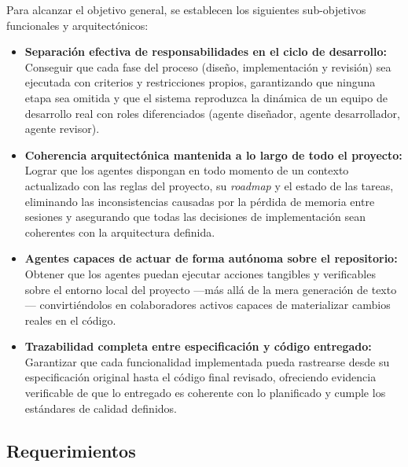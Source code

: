 \documentclass[11pt, letterpaper]{article}
\begin{document}
Para alcanzar el objetivo general, se establecen los siguientes sub-objetivos funcionales y arquitectónicos:
\begin{itemize}
    \item \textbf{Separación efectiva de responsabilidades en el ciclo de desarrollo:} Conseguir que cada fase del proceso (diseño, implementación y revisión) sea ejecutada con criterios y restricciones propios, garantizando que ninguna etapa sea omitida y que el sistema reproduzca la dinámica de un equipo de desarrollo real con roles diferenciados (agente diseñador, agente desarrollador, agente revisor).

    \item \textbf{Coherencia arquitectónica mantenida a lo largo de todo el proyecto:} Lograr que los agentes dispongan en todo momento de un contexto actualizado con las reglas del proyecto, su \textit{roadmap} y el estado de las tareas, eliminando las inconsistencias causadas por la pérdida de memoria entre sesiones y asegurando que todas las decisiones de implementación sean coherentes con la arquitectura definida.

    \item \textbf{Agentes capaces de actuar de forma autónoma sobre el repositorio:} Obtener que los agentes puedan ejecutar acciones tangibles y verificables sobre el entorno local del proyecto —más allá de la mera generación de texto— convirtiéndolos en colaboradores activos capaces de materializar cambios reales en el código.

    \item \textbf{Trazabilidad completa entre especificación y código entregado:} Garantizar que cada funcionalidad implementada pueda rastrearse desde su especificación original hasta el código final revisado, ofreciendo evidencia verificable de que lo entregado es coherente con lo planificado y cumple los estándares de calidad definidos.
\end{itemize}

\subsection{Requerimientos}
\end{document}
